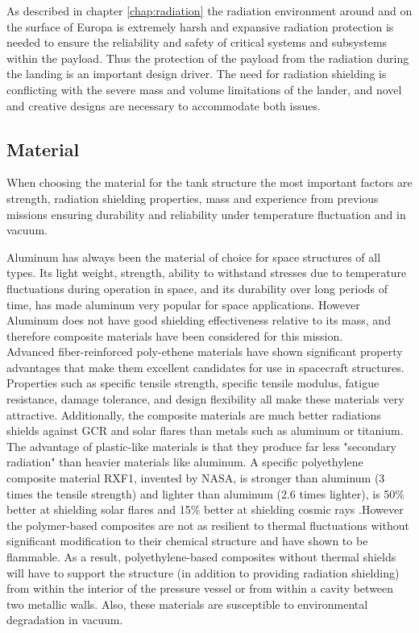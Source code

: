 \label{chap:radedl}

As described in chapter \ref{chap:radiation} the radiation environment around and on the surface of Europa is extremely harsh and expansive radiation protection is needed to ensure the reliability and safety of critical systems and subsystems within the payload. Thus the protection of the payload from the radiation during the landing is an important design driver. The need for radiation shielding is conflicting with the severe mass and volume limitations of the lander, and novel and creative designs are necessary to accommodate both issues.


\subsection{Material}

When choosing the material for the tank structure the most important factors are strength, radiation shielding properties, mass and experience from previous missions ensuring durability and reliability under temperature fluctuation and in vacuum. 

Aluminum has always been the material of choice for space structures of all types. Its light weight, strength, ability to withstand stresses due to temperature fluctuations during operation in space, and its durability over long periods of time, has made aluminum very popular for space applications. However Aluminum does not have good shielding effectiveness relative to its mass, and therefore composite materials have been considered for this mission.\\

Advanced fiber-reinforced poly-ethene materials have shown significant property advantages that make them excellent candidates for use in spacecraft structures. Properties such as specific tensile strength, specific tensile modulus, fatigue resistance, damage tolerance, and design flexibility all make these materials very attractive. Additionally, the composite materials are much better radiations shields against GCR and solar flares than metals such as aluminum or titanium. The advantage of plastic-like materials is that they produce far less "secondary radiation" than heavier materials like aluminum. A specific polyethylene composite material RXF1, invented by NASA, is stronger than aluminum (3 times the tensile strength) and lighter than aluminum (2.6 times lighter), is 50$\%$ better at shielding solar flares and 15$\%$ better at shielding cosmic rays \cite{RXF1}.However the polymer-based composites are not as resilient to thermal fluctuations without significant modification to their chemical structure and have shown to be flammable. As a result, polyethylene-based composites without thermal shields will have to support the structure (in addition to providing radiation shielding) from within the interior of the pressure vessel or from within a cavity between two metallic walls. Also, these materials are susceptible to environmental degradation in vacuum. \\
 

